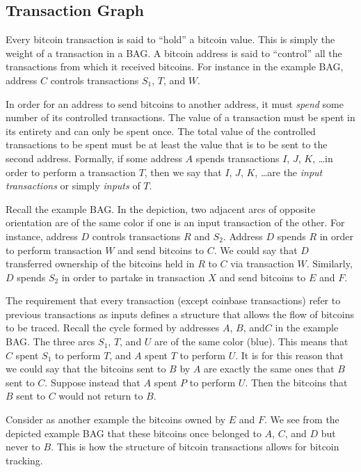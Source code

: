 \documentclass[letterpaper, 10 pt, conference]{ieeeconf}  %
\begin{document}
\subsection{Transaction Graph}

Every bitcoin transaction is said to ``hold'' a bitcoin value. This is simply the weight of a transaction in a BAG. A bitcoin address is said to ``control'' all the transactions from which it received bitcoins. For instance in the example BAG, address $C$ controls transactions $S_1$, $T$, and $W$.

In order for an address to send bitcoins to another address, it must \emph{spend} some number of its controlled transactions. The value of a transaction must be spent in its entirety and can only be spent once. The total value of the controlled transactions to be spent must be at least the value that is to be sent to the second address. Formally, if some address $A$ spends transactions $I$, $J$, $K$, \ldots in order to perform a transaction $T$, then we say that $I$, $J$, $K$, \ldots are the \emph{input transactions} or simply \emph{inputs} of $T$.

Recall the example BAG. In the depiction, two adjacent arcs of opposite orientation are of the same color if one is an input transaction of the other. For instance, address $D$ controls transactions $R$ and $S_2$. Address $D$ spends $R$ in order to perform transaction $W$ and send bitcoins to $C$. We could say that $D$ transferred ownership of the bitcoins held in $R$ to $C$ via transaction $W$. Similarly, $D$ spends $S_2$ in order to partake in transaction $X$ and send bitcoins to $E$ and $F$.

The requirement that every transaction (except coinbase transactions) refer to previous transactions as inputs defines a structure that allows the flow of bitcoins to be traced. Recall the cycle formed by addresses $A$, $B$, and$C$ in the example BAG. The three arcs $S_1$, $T$, and $U$ are of the same color (blue). This means that $C$ spent $S_1$ to perform $T$, and $A$ spent $T$ to perform $U$. It is for this reason that we could say that the bitcoins sent to $B$ by $A$ are exactly the same ones that $B$ sent to $C$. Suppose instead that $A$ spent $P$ to perform $U$. Then the bitcoins that $B$ sent to $C$ would not return to $B$.

Consider as another example the bitcoins owned by $E$ and $F$. We see from the depicted example BAG that these bitcoins once belonged to $A$, $C$, and $D$ but never to $B$. This is how the structure of bitcoin transactions allows for bitcoin tracking.
\end{document}
